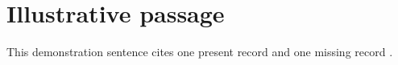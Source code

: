 \section{Illustrative passage}
This demonstration sentence cites one present record and one missing record \cite{demo-present,demo-missing}.
